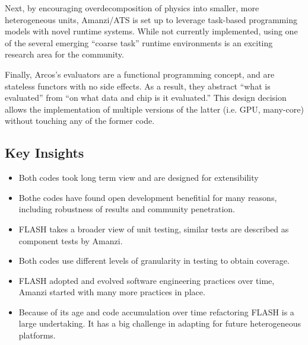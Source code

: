 Next, by encouraging overdecomposition of physics into smaller, more heterogeneous units, Amanzi/ATS is set up to leverage task-based programming models with novel runtime systems.
While not currently implemented, using one of the several emerging ``coarse task'' runtime environments \cite{BauerTSA12,Qingyu,CharmPP} is an exciting research area for the community.

Finally, Arcos's evaluators are a functional programming concept, and are stateless functors with no side effects.
As a result, they abstract ``what is evaluated'' from ``on what data and chip is it evaluated.''
This design decision allows the implementation of multiple versions of the latter (i.e. GPU, many-core) without touching any of the former code.

\subsection*{Key Insights}
\label{caseStudies-insights}
\begin{itemize}
\item Both codes took long term view and are designed for extensibility
\item Bothe codes have found open development benefitial for many reasons, including
robustness of results and community penetration.
\item FLASH takes a broader view of unit testing, similar tests are described as component tests by Amanzi.
\item Both codes use different levels of granularity in testing to obtain coverage.
\item FLASH adopted and evolved software engineering practices over time, Amanzi started with many more practices
in place.
\item Because of its age and code accumulation over time refactoring FLASH is a large undertaking. It has a big challenge in adapting for future heterogeneous platforms. 
\end{itemize}